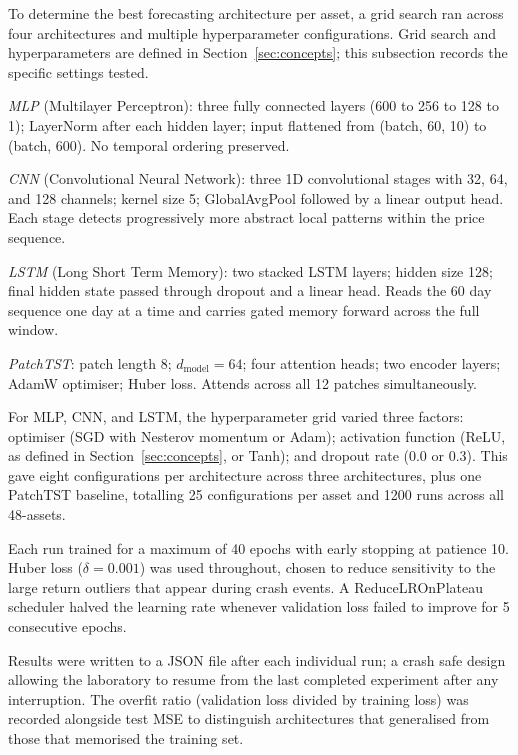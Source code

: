 \documentclass[journal]{IEEEtran}
\begin{document}
To determine the best forecasting architecture per asset, a grid search
ran across four architectures and multiple hyperparameter configurations.
Grid search and hyperparameters are defined in
Section~\ref{sec:concepts}; this subsection records the specific settings
tested.

\textit{MLP} (Multilayer Perceptron): three fully connected layers
(600 to 256 to 128 to 1); LayerNorm after each hidden layer; input
flattened from (batch, 60, 10) to (batch, 600). No temporal ordering
preserved.

\textit{CNN} (Convolutional Neural Network): three 1D convolutional
stages with 32, 64, and 128 channels; kernel size 5; GlobalAvgPool
followed by a linear output head. Each stage detects progressively more
abstract local patterns within the price sequence.

\textit{LSTM} (Long Short Term Memory): two stacked LSTM layers; hidden
size 128; final hidden state passed through dropout and a linear head.
Reads the 60 day sequence one day at a time and carries gated memory
forward across the full window.

\textit{PatchTST}: patch length 8; $d_{\text{model}} = 64$; four
attention heads; two encoder layers; AdamW optimiser; Huber loss.
Attends across all 12 patches simultaneously.

For MLP, CNN, and LSTM, the hyperparameter grid varied three factors:
optimiser (SGD with Nesterov momentum or Adam); activation function
(ReLU, as defined in Section~\ref{sec:concepts}, or Tanh); and dropout
rate (0.0 or 0.3). This gave eight configurations per architecture across
three architectures, plus one PatchTST baseline, totalling 25
configurations per asset and 1200 runs across all 48-assets.

Each run trained for a maximum of 40 epochs with early stopping at
patience 10. Huber loss ($\delta = 0.001$) was used throughout, chosen
to reduce sensitivity to the large return outliers that appear during
crash events. A ReduceLROnPlateau scheduler halved the learning rate
whenever validation loss failed to improve for 5 consecutive epochs.

Results were written to a JSON file after each individual run; a crash
safe design allowing the laboratory to resume from the last completed
experiment after any interruption. The overfit ratio (validation loss
divided by training loss) was recorded alongside test MSE to distinguish
architectures that generalised from those that memorised the training set.
\end{document}
